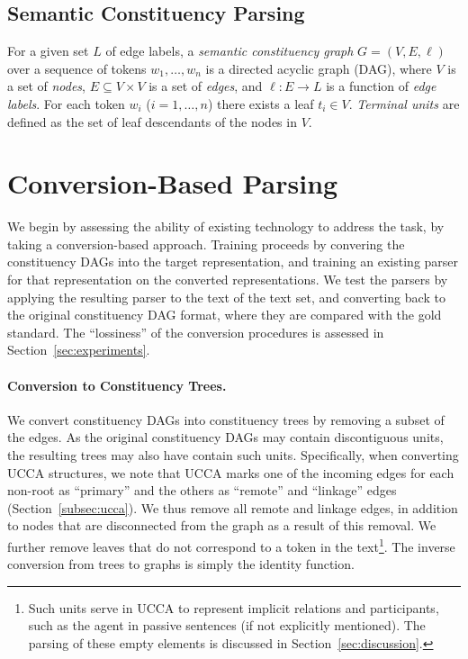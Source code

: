 \documentclass[11pt]{article}
\newcommand{\secref}[1]{Section~\ref{#1}}
\begin{document}


\subsection{Semantic Constituency Parsing}

For a given set $L$ of edge labels, a \textit{semantic constituency graph} $G=(V,E, \ell)$ over a sequence of tokens $w_1, \ldots, w_n$ is a directed acyclic graph (DAG), where $V$ is a set of \textit{nodes}, $E \subseteq V\times V$ is a set of \textit{edges}, and $\ell:E\to L$ is a function of \textit{edge labels}. For each token $w_i$ ($i=1, \ldots, n$) there exists a leaf  $t_i \in V$. {\it Terminal units} are defined as the set of leaf descendants of the nodes in $V$. 

\section{Conversion-Based Parsing}\label{sec:conversion_approach}

We begin by assessing the ability of existing technology to address the task,
by taking a conversion-based approach. Training proceeds by 
convering the constituency DAGs into the target representation,
and training an existing parser for that representation on the converted representations.
We test the parsers by applying the resulting parser to the text of the text set,
and converting back to the original constituency DAG format, where they are compared
with the gold standard. The ``lossiness'' of the conversion procedures is assessed in
\secref{sec:experiments}.

\paragraph{Conversion to Constituency Trees.}
We convert constituency DAGs into constituency trees by removing a subset of the edges.
As the original constituency DAGs may contain discontiguous units, the resulting trees
may also have contain such units.
Specifically, when converting UCCA structures, we note that UCCA marks one of the incoming edges
for each non-root as ``primary'' and the others as ``remote'' and ``linkage'' edges (\secref{subsec:ucca}).
We thus remove all remote and linkage edges, in addition to nodes that are disconnected
from the graph as a result of this removal. We further remove leaves that do not correspond to
a token in the text\footnote{Such units serve in UCCA to represent implicit relations and
  participants, such as the agent in passive sentences (if not explicitly mentioned). The parsing
  of these empty elements is discussed in \secref{sec:discussion}.}.
The inverse conversion from trees to graphs is simply the identity function.
\end{document}
